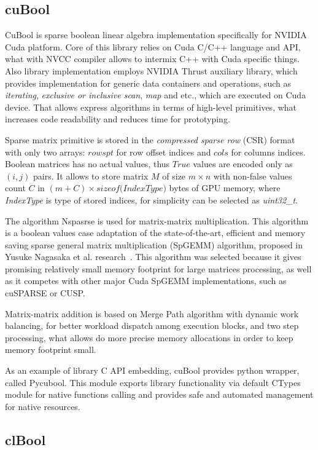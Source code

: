 \subsection{cuBool}

CuBool is sparse boolean linear algebra implementation specifically for NVIDIA Cuda platform. Core of this 
library relies on Cuda C/C++ language and API, what with NVCC compiler allows to intermix C++ with Cuda 
specific things. Also library implementation employs NVIDIA Thrust auxiliary library, which provides 
implementation for generic data containers and operations, such as \textit{iterating}, \textit{exclusive or 
inclusive scan}, \textit{map} and etc., which are executed on Cuda device. That allows express algorithms in 
terms of high-level primitives, what increases code readability and reduces time for prototyping.

Sparse matrix primitive is stored in the \textit{compressed sparse row} (CSR) format with only two arrays: 
$rowspt$ for row offset indices and $cols$ for columns indices. Boolean matrices has no actual values, thus 
$True$ values are encoded only as $(i, j)$ pairs. It allows to store matrix $M$ of size $m \times n$ with 
non-false values count $C$ in $(m + C) \times \textit{sizeof(IndexType)}$ bytes of GPU memory, where 
\textit{IndexType} is type of stored indices, for simplicity can be selected as \textit{uint32\_t}.

The algorithm Nspasrse is used for matrix-matrix multiplication. This algorithm is a boolean values case 
adaptation of the state-of-the-art, efficient and memory saving sparse general matrix multiplication (SpGEMM) 
algorithm, proposed in Yusuke Nagasaka et al. research~\cite{todo}. This algorithm was selected because it 
gives promising relatively small memory footprint for large matrices processing, as well as it competes with 
other major Cuda SpGEMM implementations, such as cuSPARSE or CUSP.  

Matrix-matrix addition is based on Merge Path algorithm with dynamic work balancing, for better workload 
dispatch among execution blocks, and two step processing, what allows do more precise memory allocations in 
order to keep memory footprint small. 

As an example of library C API embedding, cuBool provides python wrapper, called Pycubool. This module exports 
library functionality via default CTypes module for native functions calling and provides safe and automated 
management for native resources. 

\subsection{clBool}

